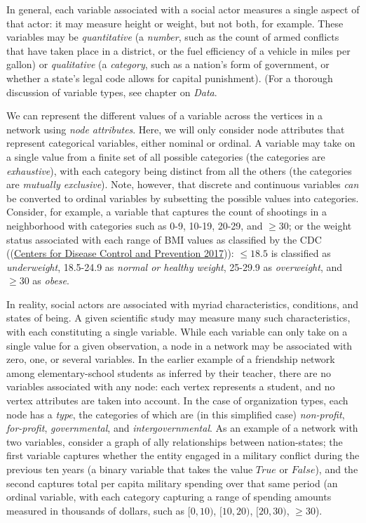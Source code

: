 \documentclass{book}
\begin{document}
In general, each variable associated with a social actor measures a single
aspect of that actor: it may measure height or weight, but not both, for
example. These variables may be \emph{quantitative} (a \emph{number}, such as
the count of armed conflicts that have taken place in a district, or the fuel
efficiency of a vehicle in miles per gallon) or \emph{qualitative} (a
\emph{category}, such as a nation's form of government, or whether a state's
legal code allows for capital punishment). (For a thorough discussion of
variable types, see chapter on \emph{Data}.

We can represent the different values of a variable across the vertices in a
network using \emph{node attributes}. Here, we will only consider node
attributes that represent categorical variables, either nominal or ordinal. A
variable may take on a single value from a finite set of all possible
categories (the categories are \emph{exhaustive}), with each category being
distinct from all the others (the categories are \emph{mutually exclusive}).
Note, however, that discrete and continuous variables \emph{can} be converted
to ordinal variables by subsetting the possible values into categories.
Consider, for example, a variable that captures the count of shootings in a
neighborhood with categories such as 0-9, 10-19, 20-29, and \(\ge30\); or the
weight status associated with each range of BMI values as classified by the
CDC ((\protect\hyperlink{ref-CDC2017}{Centers for Disease Control and
Prevention 2017})): \(\le18.5\) is classified as \emph{underweight}, 18.5-24.9
as \emph{normal or healthy weight}, 25-29.9 as \emph{overweight}, and
\(\ge30\) as \emph{obese}.

In reality, social actors are associated with myriad characteristics,
conditions, and states of being. A given scientific study may measure many
such characteristics, with each constituting a single variable. While each
variable can only take on a single value for a given observation, a node in a
network may be associated with zero, one, or several variables. In the earlier
example of a friendship network among elementary-school students as inferred
by their teacher, there are no variables associated with any node: each vertex
represents a student, and no vertex attributes are taken into account. In the
case of organization types, each node has a \emph{type}, the categories of
which are (in this simplified case) \emph{non-profit}, \emph{for-profit},
\emph{governmental}, and \emph{intergovernmental}. As an example of a network
with two variables, consider a graph of ally relationships between
nation-states; the first variable captures whether the entity engaged in a
military conflict during the previous ten years (a binary variable that takes
the value \(True\) or \(False\)), and the second captures total per capita
military spending over that same period (an ordinal variable, with each
category capturing a range of spending amounts measured in thousands of
dollars, such as \([0, 10)\), \([10, 20)\), \([20, 30)\), \(\ge30\)).
\end{document}
